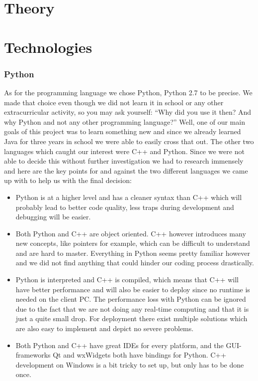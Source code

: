 \section{Theory}
\def\kapitelautor{Christoph Führer}

\section{Technologies}
\def\kapitelautor{Christoph Führer}
\subsubsection{Python}
As for the programming language we chose Python, Python 2.7 to be precise. We made that choice even though we did not learn it in school or any other extracurricular activity, so you may ask yourself: ``Why did you use it then? And why Python and not any other programming language?'' Well, one of our main goals of this project was to learn something new and since we already learned Java for three years in school we were able to easily cross that out. The other two languages which caught our interest were C++ and Python. Since we were not able to decide this without further investigation we had to research immensely and here are the key points for and against the two different languages we came up with to help us with the final decision:


\begin{itemize}
	\item Python is at a higher level and has a cleaner syntax than C++ which will probably lead to better code quality, less traps during development and debugging will be easier.
	\item Both Python and C++ are object oriented. C++ however introduces many new concepts, like pointers for example, which can be difficult to understand and are hard to master. Everything in Python seems pretty familiar however and we did not find anything that could hinder our coding process drastically.
	\item Python is interpreted and C++ is compiled, which means that C++ will have better performance and will also be easier to deploy since no runtime is needed on the client PC. The performance loss with Python can be ignored due to the fact that we are not doing any real-time computing and that it is just a quite small drop. For deployment there exist multiple solutions which are also easy to implement and depict no severe problems.
	\item Both Python and C++ have great IDEs for every platform, and the GUI-frameworks Qt and wxWidgets both have bindings for Python. C++ development on Windows is a bit tricky to set up, but only has to be done once.
\end{itemize}

